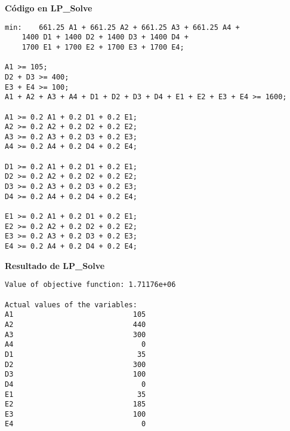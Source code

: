 \textbf{Código en LP\_Solve}
\begin{verbatim}
min:	661.25 A1 + 661.25 A2 + 661.25 A3 + 661.25 A4 +
	1400 D1 + 1400 D2 + 1400 D3 + 1400 D4 +
	1700 E1 + 1700 E2 + 1700 E3 + 1700 E4;

A1 >= 105;
D2 + D3 >= 400;
E3 + E4 >= 100;
A1 + A2 + A3 + A4 + D1 + D2 + D3 + D4 + E1 + E2 + E3 + E4 >= 1600;

A1 >= 0.2 A1 + 0.2 D1 + 0.2 E1;
A2 >= 0.2 A2 + 0.2 D2 + 0.2 E2;
A3 >= 0.2 A3 + 0.2 D3 + 0.2 E3;
A4 >= 0.2 A4 + 0.2 D4 + 0.2 E4;

D1 >= 0.2 A1 + 0.2 D1 + 0.2 E1;
D2 >= 0.2 A2 + 0.2 D2 + 0.2 E2;
D3 >= 0.2 A3 + 0.2 D3 + 0.2 E3;
D4 >= 0.2 A4 + 0.2 D4 + 0.2 E4;

E1 >= 0.2 A1 + 0.2 D1 + 0.2 E1;
E2 >= 0.2 A2 + 0.2 D2 + 0.2 E2;
E3 >= 0.2 A3 + 0.2 D3 + 0.2 E3;
E4 >= 0.2 A4 + 0.2 D4 + 0.2 E4;
\end{verbatim}

\newpage
\textbf{Resultado de LP\_Solve}
\begin{verbatim}
Value of objective function: 1.71176e+06

Actual values of the variables:
A1                            105
A2                            440
A3                            300
A4                              0
D1                             35
D2                            300
D3                            100
D4                              0
E1                             35
E2                            185
E3                            100
E4                              0
\end{verbatim}
